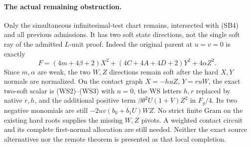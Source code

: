 \paragraph{The actual remaining obstruction.}
Only the simultaneous infinitesimal-test chart remains, intersected
with (SB4) and all previous admissions. It has two soft state
directions, not the single soft ray of the admitted $L$-unit proof.
Indeed the original parent at $u=v=0$ is exactly
\[
 F= (4m+4\beta+2)X^2+(4C+4A+4D+2)Y^2+4\alpha Z^2. \tag{SB13}
\]
Since $m,\alpha$ are weak, the two $W,Z$ directions remain soft
after the hard $X,Y$ normals are normalized. On the contact graph
$X=-huZ$, $Y=ruW$, the exact two-soft scalar is (WS2)--(WS3)
with $n=0$, the WS letters $h,r$ replaced by native $r,h$, and
the additional positive term
$\beta\theta^2U(1+V)Z^2$ in $F_g/4$. Its two negative
monomials are still $-2uv(b_0+b_1U)WZ$. No strict finite Gram
on the existing hard roots supplies the missing $W,Z$ pivots.
A weighted contact circuit and its complete first-normal allocation
are still needed. Neither the exact source alternatives nor the
remote theorem is presented as that local completion.
